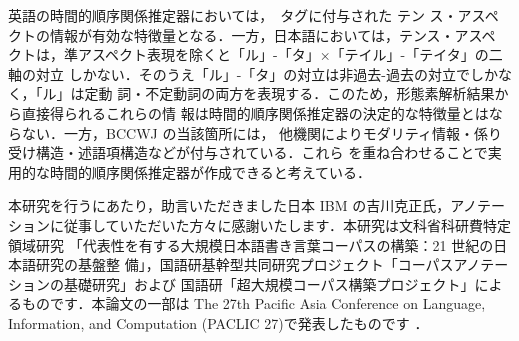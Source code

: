 \documentclass[japanese]{jnlp_1.4}
\newcommand{\modified}[1]{}
\def\makeinstance{}
\begin{document}
\modified{本研究におけるアノテーションの評価は，今回策定した基準や作業者で閉じて
いるために限定的である．今後，データを公開\footnote{http://github.com/masayu-a/BCCWJ-Timebank}し，他機関で同じ部分に付与されているさ
まざまなアノテーションを重ね合わせ，齟齬や矛盾を分析することでより深い分析が可能
になると考えられる．}

\modified{また，\ref{sec:intro}節で述べた(b)の意味での目的に応えるために，本データを学習データとして用いた日本語時間的順序関係推定器の開発を今後行っていきたい．}
英語の時間的順序関係推定器においては，\makeinstance\ タグに付与された テン
ス・アスペクトの情報が有効な特徴量となる．一方，日本語においては，テンス・アスペ
クトは，準アスペクト表現を除くと「ル」-「タ」×「テイル」-「テイタ」の二軸の対立
しかない．そのうえ「ル」-「タ」の対立は非過去-過去の対立でしかなく，「ル」は定動
詞・不定動詞の両方を表現する．このため，形態素解析結果から直接得られるこれらの情
報は時間的順序関係推定器の決定的な特徴量とはならない．一方，BCCWJ の当該箇所には，
他機関によりモダリティ情報・係り受け構造・述語項構造などが付与されている．これら
を重ね合わせることで実用的な時間的順序関係推定器が作成できると考えている．


\acknowledgment

本研究を行うにあたり，助言いただきました日本 IBM の吉川克正氏，アノテー
ションに従事していただいた方々に感謝いたします．本研究は文科省科研費特定領域研究
「代表性を有する大規模日本語書き言葉コーパスの構築：21 世紀の日本語研究の基盤整
備」，国語研基幹型共同研究プロジェクト「コーパスアノテーションの基礎研究」および
国語研「超大規模コーパス構築プロジェクト」によるものです．本論文の一部は
The 27th Pacific Asia Conference on Language, Information, and Computation
(PACLIC 27)で発表したものです \cite{asahara-2013}．
\end{document}
